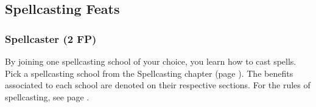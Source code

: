\subsection*{Spellcasting Feats}




\subsubsection{Spellcaster (2 FP)} \label{feat::spellcaster}
    By joining one spellcasting school of your choice, you learn how to cast spells.
    Pick a spellcasting school from the Spellcasting chapter (page \pageref{ch::spellcasting}).
    The benefits associated to each school are denoted on their respective sections.
    For the rules of spellcasting, see page \pageref{sec::spellcastingrules}.

